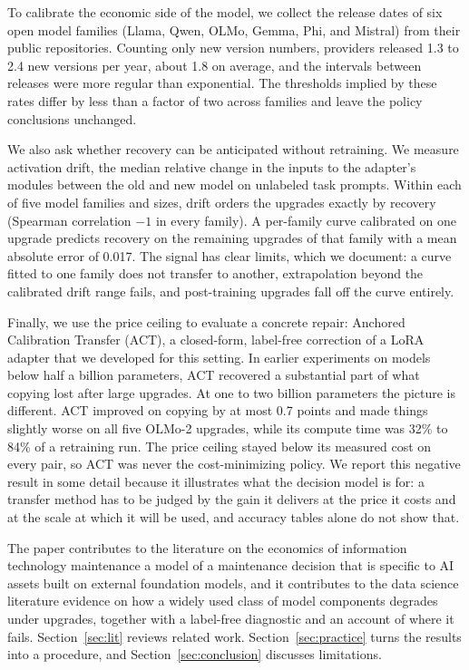 \documentclass[ijds,blindrev]{informs4}
\begin{document}
To calibrate the economic side of the model, we collect the release dates of six open model families (Llama, Qwen, OLMo, Gemma, Phi, and Mistral) from their public repositories. Counting only new version numbers, providers released 1.3 to 2.4 new versions per year, about 1.8 on average, and the intervals between releases were more regular than exponential. The thresholds implied by these rates differ by less than a factor of two across families and leave the policy conclusions unchanged.

We also ask whether recovery can be anticipated without retraining. We measure activation drift, the median relative change in the inputs to the adapter's modules between the old and new model on unlabeled task prompts. Within each of five model families and sizes, drift orders the upgrades exactly by recovery (Spearman correlation $-1$ in every family). A per-family curve calibrated on one upgrade predicts recovery on the remaining upgrades of that family with a mean absolute error of 0.017. The signal has clear limits, which we document: a curve fitted to one family does not transfer to another, extrapolation beyond the calibrated drift range fails, and post-training upgrades fall off the curve entirely.

Finally, we use the price ceiling to evaluate a concrete repair: Anchored Calibration Transfer (ACT), a closed-form, label-free correction of a LoRA adapter that we developed for this setting. In earlier experiments on models below half a billion parameters, ACT recovered a substantial part of what copying lost after large upgrades. At one to two billion parameters the picture is different. ACT improved on copying by at most 0.7 points and made things slightly worse on all five OLMo-2 upgrades, while its compute time was 32\% to 84\% of a retraining run. The price ceiling stayed below its measured cost on every pair, so ACT was never the cost-minimizing policy. We report this negative result in some detail because it illustrates what the decision model is for: a transfer method has to be judged by the gain it delivers at the price it costs and at the scale at which it will be used, and accuracy tables alone do not show that.

The paper contributes to the literature on the economics of information technology maintenance a model of a maintenance decision that is specific to AI assets built on external foundation models, and it contributes to the data science literature evidence on how a widely used class of model components degrades under upgrades, together with a label-free diagnostic and an account of where it fails. Section~\ref{sec:lit} reviews related work. Section~\ref{sec:practice} turns the results into a procedure, and Section~\ref{sec:conclusion} discusses limitations.
\end{document}
